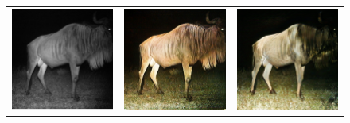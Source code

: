 \documentclass[a4paper,11pt, DIV=12]{scrartcl}
\begin{document}
\begin{figure}[ht]
\begin{tabularx}{.69\textwidth}{>{\centering\arraybackslash}X >{\centering\arraybackslash}X >{\centering\arraybackslash}X}
      \includegraphics{S2_B07_R3_PICT0492_real.png} & \includegraphics{S2_B07_R3_PICT0492_cyclegan.png} & \includegraphics{S2_B07_R3_PICT0492_cut.png} \\

\end{tabularx}
\end{figure}
\end{document}

